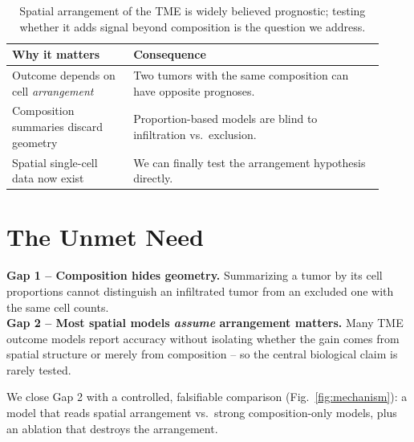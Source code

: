 \documentclass[11pt]{article}
\begin{document}
\begin{table}[h]
\centering\small
\begin{tabular}{>{\raggedright\arraybackslash}p{0.30\linewidth} >{\raggedright\arraybackslash}p{0.62\linewidth}}
\toprule
\rowcolor{sriblue}\color{white}\textbf{Why it matters} & \color{white}\textbf{Consequence}\\
\midrule
\rowcolor{srirow} Outcome depends on cell \emph{arrangement} & Two tumors with the same composition can have opposite prognoses.\\
Composition summaries discard geometry & Proportion-based models are blind to infiltration vs.\ exclusion.\\
\rowcolor{srirow} Spatial single-cell data now exist & We can finally test the arrangement hypothesis directly.\\
\bottomrule
\end{tabular}
\caption{Spatial arrangement of the TME is widely believed prognostic; testing
whether it adds signal beyond composition is the question we address.}
\label{tab:significance}
\end{table}

\section{The Unmet Need}

\begin{gapbox}
\textbf{Gap 1 -- Composition hides geometry.} Summarizing a tumor by its cell
proportions cannot distinguish an infiltrated tumor from an excluded one with
the same cell counts.\\[3pt]
\textbf{Gap 2 -- Most spatial models \emph{assume} arrangement matters.} Many
TME outcome models report accuracy without isolating whether the gain comes from
spatial structure or merely from composition -- so the central biological claim
is rarely tested.
\end{gapbox}

\noindent We close Gap 2 with a controlled, falsifiable comparison
(Fig.~\ref{fig:mechanism}): a model that reads spatial arrangement vs.\ strong
composition-only models, plus an ablation that destroys the arrangement.
\end{document}
